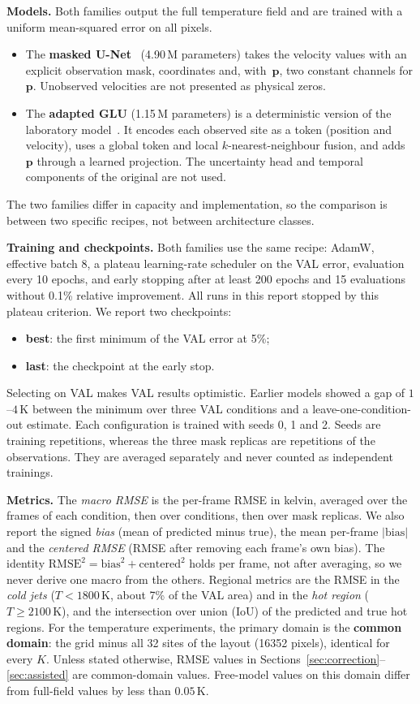 \documentclass[11pt,letterpaper]{article}
\newcommand{\K}{\,\mathrm{K}}
\newcommand{\pon}{with~$\mathbf{p}$}
\begin{document}
\textbf{Models.} Both families output the full temperature field and are trained with a uniform mean-squared error on all pixels.
\begin{itemize}
  \item The \textbf{masked U-Net}~\cite{ronneberger2015unet} (4.90\,M parameters) takes the velocity values with an explicit observation mask, coordinates and, \pon, two constant channels for $\mathbf{p}$. Unobserved velocities are not presented as physical zeros.
  \item The \textbf{adapted GLU} (1.15\,M parameters) is a deterministic version of the laboratory model~\cite{wang2026glu}. It encodes each observed site as a token (position and velocity), uses a global token and local $k$-nearest-neighbour fusion, and adds $\mathbf{p}$ through a learned projection. The uncertainty head and temporal components of the original are not used.
\end{itemize}
The two families differ in capacity and implementation, so the comparison is between two specific recipes, not between architecture classes.

\textbf{Training and checkpoints.} Both families use the same recipe: AdamW, effective batch 8, a plateau learning-rate scheduler on the VAL error, evaluation every 10 epochs, and early stopping after at least 200 epochs and 15 evaluations without 0.1\% relative improvement. All runs in this report stopped by this plateau criterion. We report two checkpoints:
\begin{itemize}
  \item \textbf{best}: the first minimum of the VAL error at 5\%;
  \item \textbf{last}: the checkpoint at the early stop.
\end{itemize}
Selecting on VAL makes VAL results optimistic. Earlier models showed a gap of $1$--$4\K$ between the minimum over three VAL conditions and a leave-one-condition-out estimate. Each configuration is trained with seeds 0, 1 and 2. Seeds are training repetitions, whereas the three mask replicas are repetitions of the observations. They are averaged separately and never counted as independent trainings.

\textbf{Metrics.} The \emph{macro RMSE} is the per-frame RMSE in kelvin, averaged over the frames of each condition, then over conditions, then over mask replicas. We also report the signed \emph{bias} (mean of predicted minus true), the mean per-frame $|\text{bias}|$ and the \emph{centered RMSE} (RMSE after removing each frame's own bias). The identity $\text{RMSE}^2=\text{bias}^2+\text{centered}^2$ holds per frame, not after averaging, so we never derive one macro from the others. Regional metrics are the RMSE in the \emph{cold jets} ($T<1800\K$, about 7\% of the VAL area) and in the \emph{hot region} ($T\ge2100\K$), and the intersection over union (IoU) of the predicted and true hot regions. For the temperature experiments, the primary domain is the \textbf{common domain}: the grid minus all 32 sites of the layout (16352 pixels), identical for every $K$. Unless stated otherwise, RMSE values in Sections~\ref{sec:correction}--\ref{sec:assisted} are common-domain values. Free-model values on this domain differ from full-field values by less than $0.05\K$.
\end{document}
